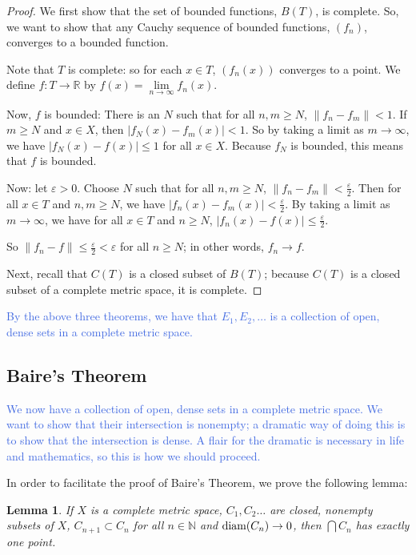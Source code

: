 \documentclass{amsart}
\newcommand{\vep}{\varepsilon}
\newcommand{\N}{\mathbb{N}}
\newcommand{\R}{\mathbb{R}}
\newcommand{\diam}{\text{\rm diam}}
\newcommand{\colorcomment}[2]{\textcolor{#1}{#2}} %
\newcommand{\absval}[1]{\lvert #1 \rvert}
\newcommand{\norm}[1]{\|#1\|}
\newtheorem{lem}[thm]{Lemma}
\theoremstyle{definition}
\begin{document}
\begin{proof}
We first show that the set of bounded functions, $B(T)$, is complete.
So, we want to show that any Cauchy sequence of bounded functions, $(f_n)$, converges to a bounded function.

Note that $T$ is complete: so for each $x \in T$, $(f_n(x))$ converges to a point. We define $f: T \to \R$ by $f(x) = \lim\limits_{n \to \infty} f_n(x)$.

Now, $f$ is bounded: 
There is an $N$ such that for all $n,m \geq N$, $\norm{f_n-f_m} < 1$.
If $m \geq N$ and $x \in X$, then $\absval{f_N(x) - f_m(x)} < 1$.
So by taking a limit as $m \to \infty$, we have $\absval{f_N(x) - f(x)} \leq 1$ for all $x \in X$.
Because $f_N$ is bounded, this means that $f$ is bounded.

Now: let $\vep >0$. Choose $N$ such that for all $n,m \geq N$, $\norm{f_n-f_m} < \frac{\vep}{2}$. 
Then for all $x \in T$ and $n,m \geq N$, we have $\absval{f_n(x) - f_m(x)} < \frac{\vep}{2}$.
By taking a limit as $m \to \infty$, we have for all $x \in T$ and $n \geq N$, $\absval{f_n(x) - f(x)} \leq \frac{\vep}{2}$.

So $\norm{f_n - f} \leq \frac{\vep}{2} < \vep$ for all $n \geq N$; in other words, $f_n \to f$.

Next, recall that $C(T)$ is a closed subset of $B(T)$; because $C(T)$ is a closed subset of a complete metric space, it is complete.

\end{proof}

\colorcomment{RoyalBlue}{By the above three theorems, we have that $E_1, E_2, \ldots$ is a collection of open, dense sets in a complete metric space.}

\subsection{Baire's Theorem}

\colorcomment{RoyalBlue}{We now have a collection of open, dense sets in a complete metric space. 
We want to show that their intersection is nonempty; a dramatic way of doing this is to show that the intersection is dense. 
A flair for the dramatic is necessary in life and mathematics, so this is how we should proceed.}

In order to facilitate the proof of Baire's Theorem, we prove the following lemma:

\begin{lem}
If $X$ is a complete metric space, $C_1, C_2 \ldots$ are closed, nonempty subsets of $X$, $C_{n+1} \subset C_n$ for all $n \in \N$ and $\diam(C_n) \to 0$, then $\bigcap C_n$ has exactly one point.
\end{lem}
\end{document}
